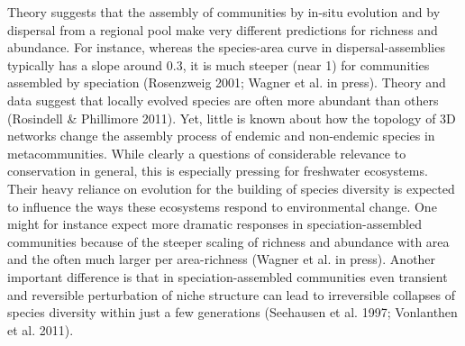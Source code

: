 \documentclass[11pt]{article}
\begin{document}
{Theory suggests that the assembly of communities by in-situ evolution
and by dispersal from a regional pool make very different predictions
for richness and abundance. For instance, whereas the species-area
curve in dispersal-assemblies typically has a slope around 0.3, it is
much steeper (near 1) for communities assembled by speciation
(Rosenzweig 2001; Wagner et al. in press). Theory and data suggest
that locally evolved species are often more abundant than others
(Rosindell & Phillimore 2011). Yet, little is known about how the
topology of 3D networks change the assembly process of endemic and
non-endemic species in metacommunities. While clearly a questions of
considerable relevance to conservation in general, this is especially
pressing for freshwater ecosystems. Their heavy reliance on evolution
for the building of species diversity is expected to influence the
ways these ecosystems respond to environmental change. One might for
instance expect more dramatic responses in speciation-assembled
communities because of the steeper scaling of richness and abundance
with area and the often much larger per area-richness (Wagner et
al. in press). Another important difference is that in
speciation-assembled communities even transient and reversible
perturbation of niche structure can lead to irreversible collapses of
species diversity within just a few generations (Seehausen et
al. 1997; Vonlanthen et al. 2011).

}
\end{document}
